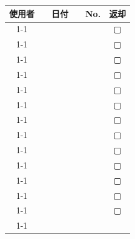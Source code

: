 \documentclass[paper=a4, fontsize=10bp]{jlreq}
\begin{document}
\begin{table}[H]
    \centering
    \begin{minipage}[h]{0.5\linewidth}
        \begin{tabular}{cccccc}
            \hspace{20bp}使用者\hspace{20bp} & & 日付 & & No. & 返却 \\ \cline{1-1} \cline{3-3} \cline{5-5}
            \multicolumn{1}{|c|}{} & & \multicolumn{1}{|c|}{} & & \multicolumn{1}{|c|}{} & ▢  \\ \cline{1-1} \cline{3-3} \cline{5-5}
            \multicolumn{1}{|c|}{} & & \multicolumn{1}{|c|}{} & & \multicolumn{1}{|c|}{} & ▢  \\ \cline{1-1} \cline{3-3} \cline{5-5}
            \multicolumn{1}{|c|}{} & & \multicolumn{1}{|c|}{} & & \multicolumn{1}{|c|}{} & ▢  \\ \cline{1-1} \cline{3-3} \cline{5-5}
            \multicolumn{1}{|c|}{} & & \multicolumn{1}{|c|}{} & & \multicolumn{1}{|c|}{} & ▢  \\ \cline{1-1} \cline{3-3} \cline{5-5}
            \multicolumn{1}{|c|}{} & & \multicolumn{1}{|c|}{} & & \multicolumn{1}{|c|}{} & ▢  \\ \cline{1-1} \cline{3-3} \cline{5-5}
            \multicolumn{1}{|c|}{} & & \multicolumn{1}{|c|}{} & & \multicolumn{1}{|c|}{} & ▢  \\ \cline{1-1} \cline{3-3} \cline{5-5}
            \multicolumn{1}{|c|}{} & & \multicolumn{1}{|c|}{} & & \multicolumn{1}{|c|}{} & ▢  \\ \cline{1-1} \cline{3-3} \cline{5-5}
            \multicolumn{1}{|c|}{} & & \multicolumn{1}{|c|}{} & & \multicolumn{1}{|c|}{} & ▢  \\ \cline{1-1} \cline{3-3} \cline{5-5}
            \multicolumn{1}{|c|}{} & & \multicolumn{1}{|c|}{} & & \multicolumn{1}{|c|}{} & ▢  \\ \cline{1-1} \cline{3-3} \cline{5-5}
            \multicolumn{1}{|c|}{} & & \multicolumn{1}{|c|}{} & & \multicolumn{1}{|c|}{} & ▢  \\ \cline{1-1} \cline{3-3} \cline{5-5}
            \multicolumn{1}{|c|}{} & & \multicolumn{1}{|c|}{} & & \multicolumn{1}{|c|}{} & ▢  \\ \cline{1-1} \cline{3-3} \cline{5-5}
            \multicolumn{1}{|c|}{} & & \multicolumn{1}{|c|}{} & & \multicolumn{1}{|c|}{} & ▢  \\ \cline{1-1} \cline{3-3} \cline{5-5}
            \multicolumn{1}{|c|}{} & & \multicolumn{1}{|c|}{} & & \multicolumn{1}{|c|}{} & ▢  \\ \cline{1-1} \cline{3-3} \cline{5-5}

\end{tabular}
\end{minipage}
\end{table}
\end{document}
